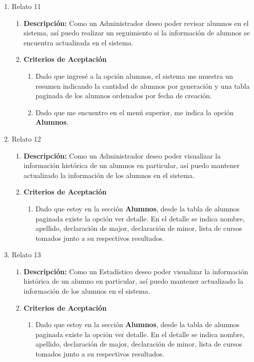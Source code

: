 \begin{enumerate}
\begin{enumerate}
\begin{enumerate}
				\end{enumerate}
		\end{enumerate}
	\item Relato 11
		\begin{enumerate}
			\item \textbf{Descripción:} Como un Administrador deseo poder revisar alumnos en el sistema, así puedo realizar un seguimiento si la información de alumnos se encuentra actualizada en el sistema.
			\item \textbf{Criterios de Aceptación}
				\begin{enumerate}
					\item Dado que ingresé a la opción alumnos, el sistema me muestra un resumen indicando la cantidad de alumnos por generación y una tabla paginada de los alumnos ordenados por fecha de creación.
					\item Dado que me encuentro en el menú superior, me indica la opción \textbf{Alumnos}.
				\end{enumerate}
		\end{enumerate}
	\item Relato 12
		\begin{enumerate}
			\item \textbf{Descripción:} Como un Administrador deseo poder visualizar la información histórica de un alumnos en particular, así puedo mantener actualizado la información de los alumnos en el sistema.
			\item \textbf{Criterios de Aceptación}
				\begin{enumerate}
					\item Dado que estoy en la sección \textbf{Alumnos}, desde la tabla de alumnos paginada existe la opción ver detalle. En el detalle se indica nombre, apellido, declaración de major, declaración de minor, lista de cursos tomados junto a su respectivos resultados.
				\end{enumerate}
		\end{enumerate}
	\item Relato 13
		\begin{enumerate}
			\item \textbf{Descripción:} Como un Estadístico deseo poder visualizar la información histórica de un alumno en particular, así puedo mantener actualizado la información de los alumnos en el sistema.
			\item \textbf{Criterios de Aceptación}
				\begin{enumerate}
					\item Dado que estoy en la sección \textbf{Alumnos}, desde la tabla de alumnos paginada existe la opción ver detalle. En el detalle se indica nombre, apellido, declaración de major, declaración de minor, lista de cursos tomados junto a su respectivos resultados.

\end{enumerate}
\end{enumerate}
\end{enumerate}
